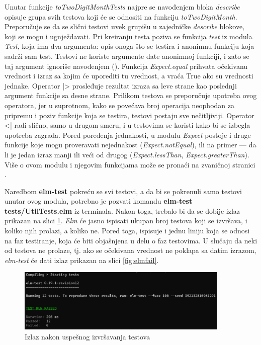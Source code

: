 \documentclass[12pt,oneside]{memoir}
\begin{document}
\par Unutar funkcije \emph{toTwoDigitMonthTests} najpre se navođenjem bloka \emph{describe} opisuje grupa svih testova koji će se odnositi na funkciju \emph{toTwoDigitMonth}. Preporučuje se da se slični testovi uvek grupišu u zajedničke \emph{describe} blokove, koji se mogu i ugnježdavati. Pri kreiranju testa poziva se funkcija \emph{test} iz modula \emph{Test}, koja ima dva argumenta: opis onoga što se testira i anonimnu funkciju koja sadrži sam test. Testovi ne koriste argumente date anonimnoj funkciji, i zato se taj argument ignoriše navođenjem (\textunderscore). Funkcija \emph{Expect.equal} prihvata očekivanu vrednost i izraz sa kojim će uporediti tu vrednost, a vraća True ako su vrednosti jednake. Operator |> prosleđuje rezultat izraza sa leve strane kao poslednji argument funkcije sa desne strane. Prilikom testova se preporučuje upotreba ovog operatora, jer u suprotnom, kako se povećava broj operacija neophodan za pripremu i poziv funkcije koja se testira, testovi postaju sve nečitljiviji. Operator <| radi slično, samo u drugom smeru, i u testovima se koristi kako bi se izbegla upotreba zagrada. Pored poređenja jednakosti, u modulu \emph{Expect} postoje i druge funkcije koje mogu proveravati nejednakost (\emph{Expect.notEqual}), ili na primer --- da li je jedan izraz manji ili veći od drugog (\emph{Expect.lessThan}, \emph{Expect.greaterThan}).  Više o ovom modulu i njegovim funkcijama može se pronaći na zvaničnoj stranici \cite{expect}.
\par Naredbom \textbf{elm-test} pokreću se svi testovi, a da bi se pokrenuli samo testovi unutar ovog modula, potrebno je pozvati komandu \textbf{elm-test tests/UtilTests.elm} iz terminala. Nakon toga, trebalo bi da se dobije izlaz prikazan na slici \ref{fig:elmpass}. \emph{Elm} će jasno ispisati ukupan broj testova koji se izvršava, i koliko njih prolazi, a koliko ne. Pored toga, ispisuje i jednu liniju koja se odnosi na faz testiranje, koja će biti objašnjena u delu o faz testovima. U slučaju da neki od testova ne prolaze, tj. ako se očekivana vrednost ne poklapa sa datim izrazom, \emph{elm-test} će dati izlaz prikazan na slici \ref{fig:elmfail}. 

\begin{figure}[!ht]
  \centering
  \includegraphics[width=0.9\textwidth]{elmpass.png}
  \caption{Izlaz nakon uspešnog izvršavanja testova}
  \label{fig:elmpass}
\end{figure}
\end{document}
